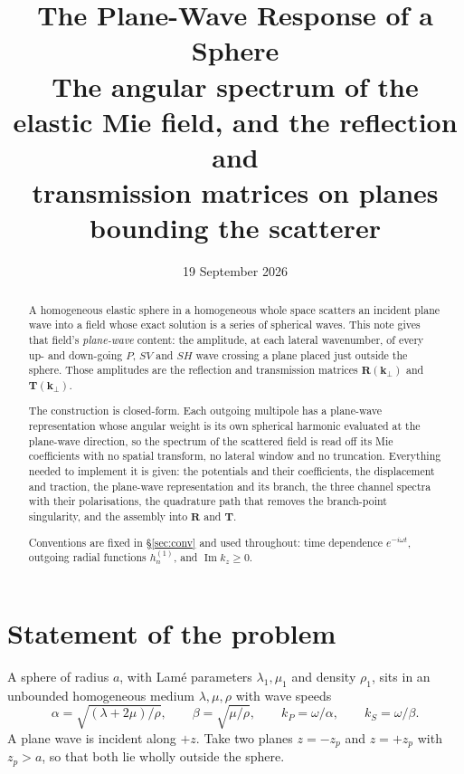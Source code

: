 \documentclass[11pt,a4paper]{article}
\title{\bfseries The Plane-Wave Response of a Sphere\\[4pt]
\large The angular spectrum of the elastic Mie field, and the reflection and\\
transmission matrices on planes bounding the scatterer}
\author{}
\date{19 September 2026}
\newcommand{\bR}{\mathbf{R}}
\newcommand{\bT}{\mathbf{T}}
\newcommand{\bk}{\mathbf{k}}
\newcommand{\kperp}{\bk_\perp}
\begin{document}
\maketitle

\begin{abstract}
\noindent
A homogeneous elastic sphere in a homogeneous whole space scatters an incident
plane wave into a field whose exact solution is a series of spherical waves.
This note gives that field's \emph{plane-wave} content: the amplitude, at each
lateral wavenumber, of every up- and down-going $P$, $SV$ and $SH$ wave crossing
a plane placed just outside the sphere.  Those amplitudes are the reflection and
transmission matrices $\bR(\kperp)$ and $\bT(\kperp)$.

The construction is closed-form.  Each outgoing multipole has a plane-wave
representation whose angular weight is its own spherical harmonic evaluated at
the plane-wave direction, so the spectrum of the scattered field is read off its
Mie coefficients with no spatial transform, no lateral window and no truncation.
Everything needed to implement it is given: the potentials and their
coefficients, the displacement and traction, the plane-wave representation and
its branch, the three channel spectra with their polarisations, the quadrature
path that removes the branch-point singularity, and the assembly into $\bR$ and
$\bT$.

Conventions are fixed in \S\ref{sec:conv} and used throughout: time dependence
$e^{-i\omega t}$, outgoing radial functions $h_n^{(1)}$, and $\operatorname{Im}
k_z \ge 0$.
\end{abstract}

\tableofcontents

\section{Statement of the problem}\label{sec:problem}

A sphere of radius $a$, with Lam\'e parameters $\lambda_1,\mu_1$ and density
$\rho_1$, sits in an unbounded homogeneous medium $\lambda,\mu,\rho$ with wave
speeds
\begin{equation}
  \alpha = \sqrt{(\lambda+2\mu)/\rho},\qquad \beta = \sqrt{\mu/\rho},
  \qquad k_P = \omega/\alpha, \qquad k_S = \omega/\beta .
\end{equation}
A plane wave is incident along $+z$.  Take two planes $z = -z_p$ and
$z = +z_p$ with $z_p > a$, so that both lie wholly outside the sphere.
\end{document}
